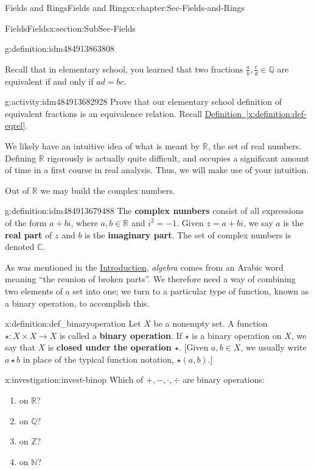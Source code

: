 \documentclass[oneside,10pt,]{book}
\newcommand{\xreffont}{\relax}
\newcommand{\terminology}[1]{\textbf{#1}}
\numberwithin{equation}{section}
\def\C{{\mathbb C}}
\def\Z{{\mathbb Z}}
\def\Q{{\mathbb Q}}
\def\N{{\mathbb N}}
\def\R{{\mathbb R}}
\begin{document}
\begin{chapterptx}{Fields and Rings}{}{Fields and Rings}{}{}{x:chapter:Sec-Fields-and-Rings}
\begin{sectionptx}{Fields}{}{Fields}{}{}{x:section:SubSec-Fields}
\begin{definition}{}{g:definition:idm484913863808}
%
\end{definition}
Recall that in elementary school, you learned that two fractions \(\frac{a}{b}, \frac{c}{d} \in \Q\) are equivalent if and only if \(ad=bc\).%
\begin{activity}{}{g:activity:idm484913682928}%
Prove that our elementary school definition of equivalent fractions is an equivalence relation. Recall \hyperref[x:definition:def-eqrel]{Definition~{\xreffont\ref{x:definition:def-eqrel}}}.%
\end{activity}
We likely have an intuitive idea of what is meant by \(\R\), the set of real numbers. Defining \(\R\) rigorously is actually quite difficult, and occupies a significant amount of time in a first course in real analysis. Thus, we will make use of your intuition. %
\par
Out of \(\R\) we may build the complex numbers.%
\begin{definition}{}{g:definition:idm484913679488}%
The \terminology{complex numbers} consist of all expressions of the form \(a+bi\), where \(a,b\in \R\) and \(i^2 = -1\). Given \(z = a+bi\), we say \(a\) is the \terminology{real part} of \(z\) and \(b\) is the \terminology{imaginary part}. The set of complex numbers is denoted \(\C\).%
\end{definition}
As was mentioned in the \hyperref[x:preface:Sec-Introduction]{Introduction}, \emph{algebra} comes from an Arabic word meaning ``the reunion of broken parts''. We therefore need a way of combining two elements of a set into one; we turn to a particular type of function, known as a binary operation, to accomplish this.%
\begin{definition}{}{x:definition:def_binaryoperation}%
%
 Let \(X\) be a nonempty set. A function \(\star : X \times X \to X\) is called a \terminology{binary operation}. If \(\star\) is a binary operation on \(X\), we say that \(X\) is \terminology{closed under the operation \(\star\)}. [Given \(a,b\in X\), we usually write \(a\star b\) in place of the typical function notation, \(\star(a,b)\).]%
\end{definition}
\begin{investigation}{}{x:investigation:invest-binop}%
Which of \(+, -, \cdot, \div\) are binary operations:%
\begin{enumerate}
\item{}on \(\R\)?%
\item{}on \(\Q\)?%
\item{}on \(\Z\)?%
\item{}on \(\N\)?%

\end{enumerate}
\end{investigation}
\end{sectionptx}
\end{chapterptx}
\end{document}
